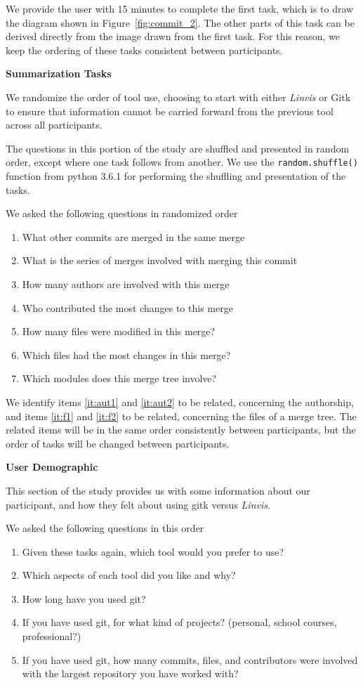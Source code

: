 We provide the user with 15 minutes to complete the first task, which is
to draw the diagram shown in Figure~\ref{fig:commit_2}. The other parts
of this task can be derived directly from the image drawn from the first
task. For this reason, we keep the ordering of these tasks consistent
between participants.

\textbf{Summarization Tasks}

We randomize the order of tool use, choosing to start with either
\emph{Linvis} or Gitk to ensure that information cannot be carried
forward from the previous tool across all participants.

The questions in this portion of the study are shuffled and presented in
random order, except where one task follows from another. We use the
\verb|random.shuffle()| function from python 3.6.1 for performing the
shuffling and presentation of the tasks.

We asked the following questions in randomized order
\begin{enumerate}
  \item What other commits are merged in the same merge
  \item What is the series of merges involved with merging this commit
  \item \label{it:aut1} How many authors are involved with this merge
  \item \label{it:aut2}Who contributed the most changes to this merge
  \item \label{it:f1}How many files were modified in this merge?
  \item \label{it:f2}Which files had the most changes in this merge?
  \item Which modules does this merge tree involve?
\end{enumerate}

We identify items \ref{it:aut1} and \ref{it:aut2} to be related,
concerning the authorship, and items \ref{it:f1} and \ref{it:f2} to be
related, concerning the files of a merge tree. The related items will be
in the same order consistently between participants, but the order of
tasks will be changed between participants.

\textbf{User Demographic}

This section of the study provides us with some information about our
participant, and how they felt about using gitk versus \emph{Linvis}.

We asked the following questions in this order
\begin{enumerate}
  \item Given these tasks again, which tool would you prefer to use?
  \item Which aspects of each tool did you like and why?
  \item How long have you used git?
  \item If you have used git, for what kind of projects? (personal,
    school courses, professional?)
  \item If you have used git, how many commits, files, and contributors
    were involved with the largest repository you have worked with?
\end{enumerate}

